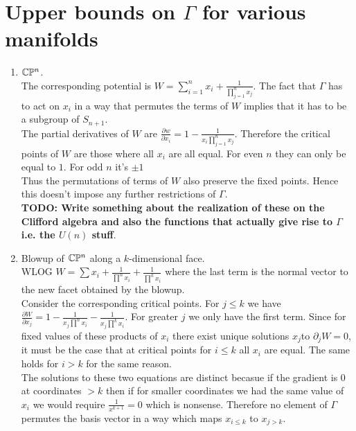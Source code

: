 \documentclass[a4paper]{article}
\begin{document}
\section{Upper bounds on $\Gamma$ for various manifolds}
\begin{enumerate}
    \item $\mathbb{C}\mathbb{P}^{n}$.\\ The corresponding potential is $W=\sum_{i=1}^{n} x_{i} + \frac{1}{\prod_{j=1}^{n} x_{j} }$. The fact that $\Gamma$ has to act on $x_{i}$ in a way that permutes the terms of $W$ implies that it has to be a subgroup of $S_{n+1}$.\\
        The partial derivatives of $W$ are $\frac{\partial w}{\partial x_{i}} =1-\frac{1}{x_{i}\prod_{j=1}^{n}x_{j}}$. Therefore the critical points of $W$ are those where all  $x_{i}$ are all equal. For even $n$ they can only be equal to $1$. For odd $n$ it's $\pm 1$\\
        Thus the permutations of terms of $W$ also preserve the fixed points. Hence this doesn't impose any further restrictions of $\Gamma$.\\
        \textbf{TODO: Write something about the realization of these on the Clifford algebra and also the functions that actually give rise to $\Gamma$ i.e. the $U(n)$ stuff}.\\
    \item Blowup of $\mathbb{C}\mathbb{P}^{n}$ along a $k$-dimensional face.\\
        WLOG $W=\sum x_{i}+\frac{1}{\prod ^n x_{i}}+\frac{1}{\prod ^k x_{i}}$ where the last term is the normal vector to the new facet obtained by the blowup.\\
        Consider the corresponding critical points. For $j\le k$ we have $\frac{\partial W}{\partial x_{j}} =1-\frac{1}{x_{j}\prod^n x_{i}} - \frac{1}{x_{j}\prod^k x_{i}}$. For greater $j$ we only have the first term.
        Since for fixed values of these products of $x_{i}$ there exist unique solutions $x_{j}$to $\partial_j W=0$, it must be the case that at critical points for $i\le k$ all $x_{i}$     are equal. The same holds for $i>k$ for the same reason. \\
        The solutions to these two equations are distinct becasue if the gradient is 0 at coordinates $>  k$ then if for smaller coordinates we had the same value of  $x_{i}$ we would require $\frac{1}{x^{k+1}}=0$ which is nonsense. Therefore  no element of $\Gamma $ permutes the basis vector in a way which maps $x_{i\le k}$ to $x_{j>k}$.\\

\end{enumerate}
\end{document}
